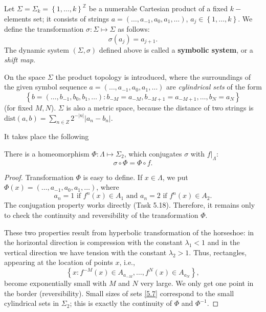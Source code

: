 \begin{definition}
	Let $\Sigma =\Sigma _{k}=\left\{ 1,\ldots ,k\right\} ^{\mathbb{Z}}$ be a numerable Cartesian product of a fixed $k-$elements set; it consists of strings $a=\left( \ldots ,a_{-1},a_{0},a_{1},\ldots \right)$, $a_{j}\in \left\{
	1,\ldots ,k\right\}$. We define the transformation $\sigma :\Sigma \longmapsto \Sigma $ as follows:
	$$
	\sigma \left(a _{j}\right)=a_{j+1}.
	$$
	The dynamic system $\left( \Sigma ,\sigma \right) $ defined above is called a \textbf{symbolic system}, or a \emph{shift map}.
	
	On the space $\Sigma$ the product topology is introduced, where the surroundings of the given symbol sequence $a=\left( \ldots, a_{-1}, a_{0}, a_{1}, \ldots \right) $ are \emph{cylindrical sets} of the form
	$$
	\left\{ b=\left( \ldots ,b_{-1},b_{0},b_{1},\ldots \right)
	:b_{-M}=a_{-M},b_{-M+1}=a_{-M+1},\ldots ,b_{N}=a_{N}\right\}
	$$
	(for fixed $ M, N $). $\Sigma$ is also a metric space, because the distance of two strings is $\textrm{dist}\left(a, b\right) = \sum_{n \in Z}2^{ -\left\vert n\right\vert }\left\vert a_{n} - b_{n} \right\vert$.
\end{definition}

It takes place the following

\begin{theorem}
	There is a homeomorphism $\Phi: \Lambda \longmapsto \Sigma _{2}$, which conjugates $\sigma $ with $f|_{\Lambda }:$
	$$
	\sigma \circ \Phi =\Phi \circ f.
	$$
	\begin{proof}
		Transformation $\Phi $ is easy to define. If $x\in \Lambda $, we put $\Phi (x)=\left(
		\ldots ,a_{-1},a_{0},a_{1},\ldots \right)$, where
		$$
		a_{n}=1\text{ \ if \ }f^{n}(x)\in A_{1}\text{ \ and \ }a_{n}=2\text{ \ if \ } f^{n}(x)\in A_{2}.
		$$
		The conjugation property works directly (Task 5.18). Therefore, it remains only to check the continuity and reversibility of the transformation $\Phi$.
		
		These two properties result from hyperbolic transformation of the horseshoe: in the horizontal direction is compression with the constant $\lambda _{1}<1$ and in the vertical direction we have tension with the constant $\lambda _{2}>1$. Thus, rectangles, appearing at the location of points $x$, i.e., \begin{equation}
		\label{5.7}
		\left\{ x:f^{-M}(x)\in A_{a_{-M}},\ldots ,f^{N}(x)\in A_{a_{N}}\right\} ,
		\end{equation}
		become exponentially small with $M$ and $N$ very large. We only get one point in the border (reversibility). Small sizes of sets \eqref{5.7} correspond to the small cylindrical sets in $\Sigma_2$; this is exactly the continuity of $\Phi$ and $\Phi ^{-1}$.
	\end{proof}
\end{theorem}

